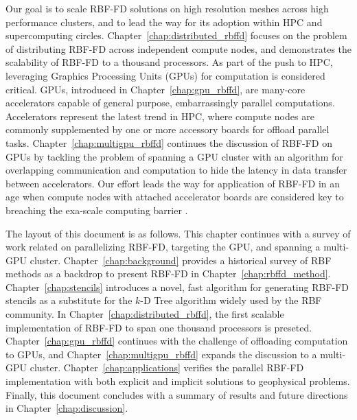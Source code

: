 \documentclass[11pt]{report}
\begin{document}
{Our goal is to scale RBF-FD solutions on high resolution meshes across high performance clusters, and to lead the way for its adoption within HPC and supercomputing circles. Chapter~\ref{chap:distributed_rbffd} focuses on the problem of distributing RBF-FD across independent compute nodes, and demonstrates the scalability of RBF-FD to a thousand processors. As part of the push to HPC, leveraging Graphics Processing Units (GPUs) for computation is considered critical. GPUs, introduced in Chapter~\ref{chap:gpu_rbffd}, are many-core accelerators capable of general purpose, embarrassingly parallel computations. Accelerators represent the latest trend in HPC, where compute nodes are commonly supplemented by one or more accessory boards for offload parallel tasks. Chapter~\ref{chap:multigpu_rbffd} continues the discussion of RBF-FD on GPUs by tackling the problem of spanning a GPU cluster with an algorithm for overlapping communication and computation to hide the latency in data transfer between accelerators. Our effort leads the way for application of RBF-FD in an age when compute nodes with attached accelerator boards are considered key to breaching the exa-scale computing barrier \cite{GPUandExascale2011}. 

The layout of this document is as follows. This chapter continues with a survey of work related on parallelizing RBF-FD, targeting the GPU, and spanning a multi-GPU cluster. Chapter~\ref{chap:background} provides a historical survey of RBF methods as a backdrop to present RBF-FD in Chapter~\ref{chap:rbffd_method}. Chapter~\ref{chap:stencils} introduces a novel, fast algorithm for generating RBF-FD stencils as a substitute for the $k$-D Tree algorithm widely used by the RBF community. In Chapter~\ref{chap:distributed_rbffd}, the first scalable implementation of RBF-FD to span one thousand processors is preseted. Chapter~\ref{chap:gpu_rbffd} continues with the challenge of offloading computation to GPUs, and Chapter~\ref{chap:multigpu_rbffd} expands the discussion to a multi-GPU cluster. Chapter~\ref{chap:applications} verifies the parallel RBF-FD implementation with both explicit and implicit solutions to geophysical problems. Finally, this document concludes with a summary of results and future directions in Chapter~\ref{chap:discussion}.


}
\end{document}
